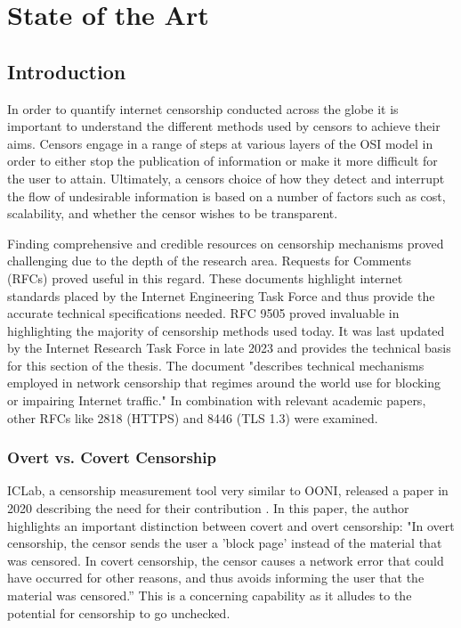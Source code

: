 \chapter{State of the Art}
\section{Introduction}

In order to quantify internet censorship conducted across the globe it is important to understand the different methods used by censors to achieve their aims. Censors engage in a range of steps at various layers of the OSI model in order to either stop the publication of information or make it more difficult for the user to attain. Ultimately, a censors choice of how they detect and interrupt the flow of undesirable information is based on a number of factors such as cost, scalability, and whether the censor wishes to be transparent.

Finding comprehensive and credible resources on censorship mechanisms proved challenging due to the depth of the research area. Requests for Comments (RFCs) proved useful in this regard. These documents highlight internet standards placed by the Internet Engineering Task Force and thus provide the accurate technical specifications needed. RFC 9505 proved invaluable in highlighting the majority of censorship methods used today. It was last updated by the Internet Research Task Force in late 2023 and provides the technical basis for this section of the thesis. The document "describes technical mechanisms employed in network censorship that regimes around the world use for blocking or impairing Internet traffic."\cite{rfc9505} In combination with relevant academic papers, other RFCs like 2818 (HTTPS) \cite{rfc2818} and 8446 (TLS 1.3) \cite{rfc8446} were examined.

\subsection{Overt vs. Covert Censorship }
ICLab, a censorship measurement tool very similar to OONI, released a paper in 2020 describing the need for their contribution \cite{9152784}. In this paper, the author highlights an important distinction between covert and overt censorship: "In overt censorship, the censor sends the user a 'block page' instead of the material that was censored. In covert censorship, the censor causes a network error that could have occurred for other reasons, and thus avoids informing the user that the material was censored.” \cite{9152784} This is a concerning capability as it alludes to the potential for censorship to go unchecked. 


